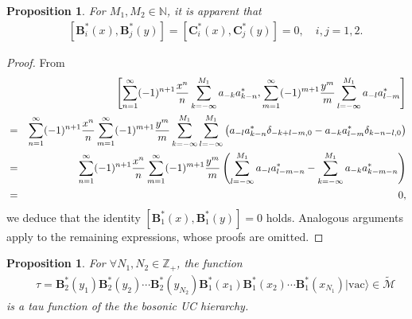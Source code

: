 \documentclass[11pt,reqno]{amsart}
\numberwithin{equation}{section}
\newtheorem{proposition}[theorem]{Proposition}
\begin{document}
\begin{proposition}
For $M_{1},M_{2}\in\mathbb{N}$, it is apparent that
\begin{eqnarray}
&&[\mathbf{B}^{\ast}_{i}(x),\mathbf{B}^{\ast}_{j}(y)]
=[\mathbf{C}^{\ast}_{i}(x),\mathbf{C}^{\ast}_{j}(y)]=0,\quad i,j=1,2.
\end{eqnarray}
\end{proposition}

\begin{proof}
From
\begin{eqnarray}
&&\left[\sum\limits^{\infty}_{n=1}(-1)^{n+1}\frac{x^{n}}{n}\sum\limits^{M_{1}}
_{k=-\infty}a_{-k}a^{\ast}_{k-n},\sum\limits^{\infty}_{m=1}(-1)^{m+1}
\frac{y^{m}}{m}\sum\limits^{M_{1}}
_{l=-\infty}a_{-l}a^{\ast}_{l-m}\right]\notag\\
&=&\sum\limits^{\infty}_{n=1}(-1)^{n+1}\frac{x^{n}}{n}\sum\limits^{\infty}_{m=1}(-1)^{m+1}
\frac{y^{m}}{m}\sum\limits^{M_{1}}_{k=-\infty}\sum\limits^{M_{1}}_{l=-\infty}
\left(a_{-l}a^{\ast}_{k-n}\delta_{-k+l-m,0}-a_{-k}a^{\ast}_{l-m}\delta_{k-n-l,0}\right)\notag\\
&=&\sum\limits^{\infty}_{n=1}(-1)^{n+1}\frac{x^{n}}{n}\sum\limits^{\infty}_{m=1}(-1)^{m+1}
\frac{y^{m}}{m}\left(\sum\limits^{M_{1}}_{l=-\infty}a_{-l}a^{\ast}_{l-m-n}-\sum\limits^{M_{1}}
_{k=-\infty}a_{-k}a^{\ast}_{k-m-n}\right)\notag\\
&=&0,
\end{eqnarray}
we deduce that the identity $[\mathbf{B}^{\ast}_{1}(x),\mathbf{B}^{\ast}_{1}(y)]=0$ holds. Analogous arguments apply to the remaining expressions, whose proofs are omitted.
\end{proof}

\begin{proposition}
For $\forall N_{1}, N_{2}\in \mathbb{Z}_{+}$, the function
\begin{eqnarray}
&&\tau=\mathbf{B}^{\ast}_{2}(y_{1})\mathbf{B}^{\ast}_{2}(y_{2})\cdots
\mathbf{B}^{\ast}_{2}(y_{N_{2}})\mathbf{B}^{\ast}_{1}(x_{1})
\mathbf{B}^{\ast}_{1}(x_{2})\cdots\mathbf{B}^{\ast}_{1}(x_{N_{1}})|\text{vac}\rangle \in \mathcal{\widetilde{M}}
\end{eqnarray}
is a tau function of the the bosonic UC hierarchy.
\end{proposition}
\end{document}
